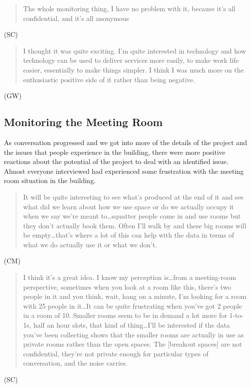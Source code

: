 \begin{quote}The whole monitoring thing, I have no problem with it, because it’s
all confidential, and it’s all anonymous\end{quote} (SC)

\begin{quote}I thought it was quite exciting. I’m quite interested in technology
and how technology can be used to deliver services more easily, to
make work life easier, essentially to make things simpler. I think I
was much more on the enthusiastic positive side of it rather than
being negative.\end{quote} (GW)

\subsection{Monitoring the Meeting Room}

As conversation progressed and we got into more of the details of the
project and the issues that people experience in the building, there
were more positive reactions about the potential of the project to
deal with an identified issue. Almost everyone interviewed had
experienced some frustration with the meeting room situation in the
building.

\begin{quote}It will be quite interesting to see what’s produced at the end of it
and see what did we learn about how we use space or do we actually
occupy it when we say we’re meant to\ldots squatter people come in and use
rooms but they don’t actually book them. Often I’ll walk by and these
big rooms will be empty\ldots that’s where a lot of this can help with the
data in terms of what we do actually use it or what we don’t.\end{quote} (CM)

\begin{quote}I think it’s a great idea. I know my perception is\ldots from a
meeting-room perspective, sometimes when you look at a room like this,
there’s two people in it and you think, wait, hang on a minute, I’m
looking for a room with 25 people in it\ldots It can be quite frustrating
when you’ve got 2 people in a room of 10. Smaller rooms seem to be in
demand a lot more for 1-to-1s, half an hour slots, that kind of
thing\ldots I’ll be interested if the data you’ve been collecting shows that
the smaller rooms are actually in use as private rooms rather than the
open spaces. The [breakout spaces] are not confidential, they’re not
private enough for particular types of conversation, and the noise
carries.\end{quote} (SC)

